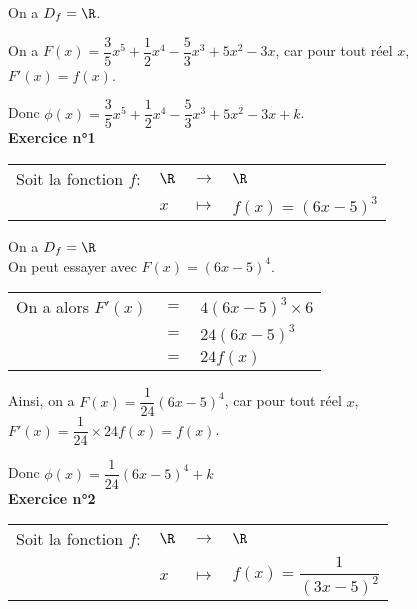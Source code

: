 On a $D_f = \R$.

\vspace*{.5cm}

On a $F(x) = \dfrac{3}{5}x^5 + \dfrac{1}{2}x^4 - \dfrac{5}{3}x^3 + 5x^2 - 3x$, car pour tout réel $x$, $F'(x) = f(x)$. 

\vspace*{.5cm}

Donc $\phi\left(x\right) = \dfrac{3}{5}x^5 + \dfrac{1}{2}x^4 - \dfrac{5}{3}x^3 + 5x^2 - 3x + k$. \\

\textbf{Exercice n°1} \\

\begin{tabular}{llll}
\hspace*{-.3cm} Soit la fonction $f:$ & $\R$ & $\longrightarrow$ & $\R$ \\
& $x$ & $\longmapsto$ & $f(x) = \left(6x - 5\right)^3$ \\
\end{tabular}

\vspace*{.3cm}

On a $D_f = \R$ \\

On peut essayer avec $F(x) = \left(6x - 5\right)^4$. \\

\begin{tabular}{lll}
\hspace*{-.3cm} On a alors $F'(x)$ & $=$ & $ 4 \left(6x - 5\right)^3 \times 6$ \\
& $=$ & $24 \left(6x-5\right)^3$ \\
& $=$ & $24 f\left(x\right)$ \\
\end{tabular}

\vspace*{.5cm}

Ainsi, on a $F(x) = \dfrac{1}{24}\left(6x-5\right)^4$, car pour tout réel $x$, $F'\left(x\right) = \dfrac{1}{24}\times 24f\left(x\right) = f\left(x\right)$. 

\vspace*{.5cm}

Donc $\phi\left(x\right) = \dfrac{1}{24}\left(6x-5\right)^4 + k$ \\

\textbf{Exercice n°2} \\

\begin{tabular}{llll}
\hspace*{-.3cm} Soit la fonction $f:$ & $\R$ & $\longrightarrow$ & $\R$ \\
& $x$ & $\longmapsto$ & $f(x) = \dfrac{1}{\left(3x-5\right)^2}$ \\
\end{tabular}

